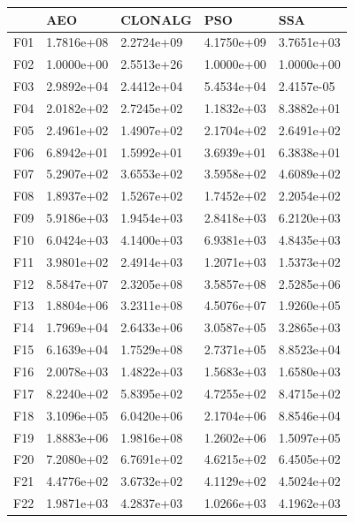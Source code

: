\documentclass[10pt,a4paper]{article}
\begin{document}
\begin{table}[H]
\begin{center}
\begin{tabular}{lllll}
	\toprule
	{} &         AEO &       CLONALG &         PSO &         SSA \\
	\midrule
	F01  &  1.7816e+08 &  2.2724e+09 &  4.1750e+09 &  3.7651e+03 \\
	F02  &  1.0000e+00 &  2.5513e+26 &  1.0000e+00 &  1.0000e+00 \\
	F03  &  2.9892e+04 &  2.4412e+04 &  5.4534e+04 &  2.4157e-05 \\
	F04  &  2.0182e+02 &  2.7245e+02 &  1.1832e+03 &  8.3882e+01 \\
	F05  &  2.4961e+02 &  1.4907e+02 &  2.1704e+02 &  2.6491e+02 \\
	F06  &  6.8942e+01 &  1.5992e+01 &  3.6939e+01 &  6.3838e+01 \\
	F07  &  5.2907e+02 &  3.6553e+02 &  3.5958e+02 &  4.6089e+02 \\
	F08  &  1.8937e+02 &  1.5267e+02 &  1.7452e+02 &  2.2054e+02 \\
	F09  &  5.9186e+03 &  1.9454e+03 &  2.8418e+03 &  6.2120e+03 \\
	F10  &  6.0424e+03 &  4.1400e+03 &  6.9381e+03 &  4.8435e+03 \\
	F11  &  3.9801e+02 &  2.4914e+03 &  1.2071e+03 &  1.5373e+02 \\
	F12  &  8.5847e+07 &  2.3205e+08 &  3.5857e+08 &  2.5285e+06 \\
	F13  &  1.8804e+06 &  3.2311e+08 &  4.5076e+07 &  1.9260e+05 \\
	F14  &  1.7969e+04 &  2.6433e+06 &  3.0587e+05 &  3.2865e+03 \\
	F15  &  6.1639e+04 &  1.7529e+08 &  2.7371e+05 &  8.8523e+04 \\
	F16  &  2.0078e+03 &  1.4822e+03 &  1.5683e+03 &  1.6580e+03 \\
	F17  &  8.2240e+02 &  5.8395e+02 &  4.7255e+02 &  8.4715e+02 \\
	F18  &  3.1096e+05 &  6.0420e+06 &  2.1704e+06 &  8.8546e+04 \\
	F19  &  1.8883e+06 &  1.9816e+08 &  1.2602e+06 &  1.5097e+05 \\
	F20  &  7.2080e+02 &  6.7691e+02 &  4.6215e+02 &  6.4505e+02 \\
	F21  &  4.4776e+02 &  3.6732e+02 &  4.1129e+02 &  4.5024e+02 \\
	F22  &  1.9871e+03 &  4.2837e+03 &  1.0266e+03 &  4.1962e+03 \\

\end{tabular}
\end{center}
\end{table}
\end{document}
